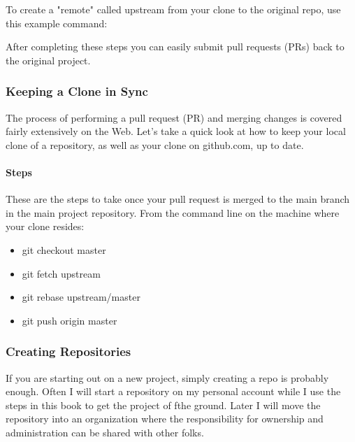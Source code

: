 To create a "remote" called upstream from your clone to the original
repo, use this example command:

\begin{Shaded}
\begin{Highlighting}[]
\end{Highlighting}
\end{Shaded}

After completing these steps you can easily submit pull requests (PRs)
back to the original project.

\hypertarget{keeping-a-clone-in-sync}{%
\subsubsection{Keeping a Clone in Sync}\label{keeping-a-clone-in-sync}}

The process of performing a pull request (PR) and merging changes is
covered fairly extensively on the Web. Let's take a quick look at how to
keep your local clone of a repository, as well as your clone on
github.com, up to date.

\hypertarget{steps-1}{%
\paragraph{Steps}\label{steps-1}}

These are the steps to take once your pull request is merged to the main
branch in the main project repository. From the command line on the
machine where your clone resides:

\begin{itemize}
\tightlist
\item
  git checkout master
\item
  git fetch upstream
\item
  git rebase upstream/master
\item
  git push origin master
\end{itemize}

\hypertarget{creating-repositories}{%
\subsubsection{Creating Repositories}\label{creating-repositories}}

If you are starting out on a new project, simply creating a repo is
probably enough. Often I will start a repository on my personal account
while I use the steps in this book to get the project of fthe ground.
Later I will move the repository into an organization where the
responsibility for ownership and administration can be shared with other
folks.

